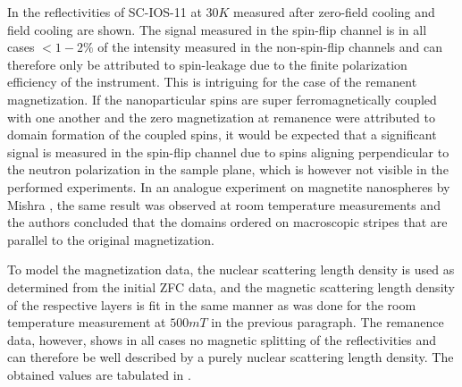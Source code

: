 \documentclass[\main/dresen_thesis.tex]{subfiles}
\begin{document}
  In  the reflectivities of SC-IOS-11 at $30 \unit{K}$ measured after zero-field cooling and field cooling are shown.
  The signal measured in the spin-flip channel is in all cases $<1-2 \%$ of the intensity measured in the non-spin-flip channels and can therefore only be attributed to spin-leakage due to the finite polarization efficiency of the instrument.
  This is intriguing for the case of the remanent magnetization.
  If the nanoparticular spins are super ferromagnetically coupled with one another and the zero magnetization at remanence were attributed to domain formation of the coupled spins, it would be expected that a significant signal is measured in the spin-flip channel due to spins aligning perpendicular to the neutron polarization in the sample plane, which is however not visible in the performed experiments.
  In an analogue experiment on magnetite nanospheres by Mishra \etal \cite{Mishra_2015_Polar}, the same result was observed at room temperature measurements and the authors concluded that the domains ordered on macroscopic stripes that are parallel to the original magnetization.

  To model the magnetization data, the nuclear scattering length density is used as determined from the initial ZFC data, and the magnetic scattering length density of the respective layers is fit in the same manner as was done for the room temperature measurement at $500 \unit{mT}$ in the previous paragraph.
  The remanence data, however, shows in all cases no magnetic splitting of the reflectivities and can therefore be well described by a purely nuclear scattering length density.
  The obtained values are tabulated in .
\end{document}
